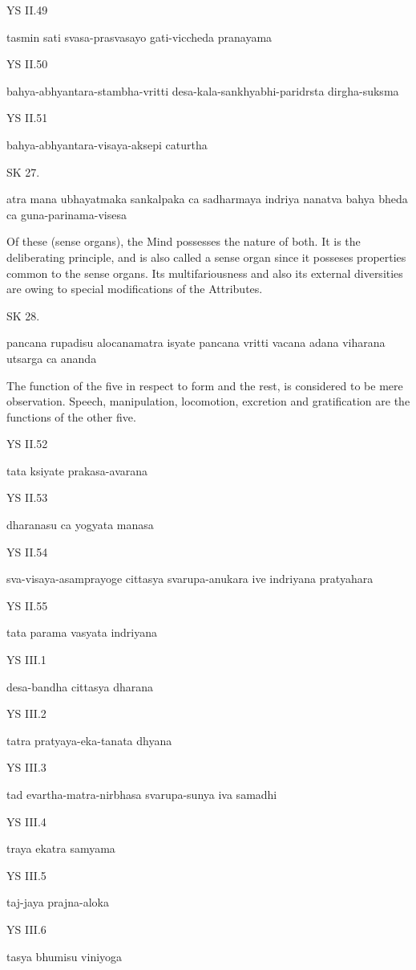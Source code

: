 YS II.49

tasmin sati svasa-prasvasayo gati-viccheda pranayama

YS II.50

bahya-abhyantara-stambha-vritti desa-kala-sankhyabhi-paridrsta dirgha-suksma

YS II.51

bahya-abhyantara-visaya-aksepi caturtha

SK 27.

atra mana ubhayatmaka sankalpaka ca sadharmaya indriya
nanatva bahya bheda ca guna-parinama-visesa

Of these (sense organs), the Mind possesses the nature of both.
It is the deliberating principle, and is also called a sense organ
since it posseses properties common to the sense organs.
Its multifariousness and also its external diversities are owing
to special modifications of the Attributes.

SK 28.

pancana rupadisu alocanamatra isyate
pancana vritti vacana adana viharana utsarga ca ananda

The function of the five in respect to form and the rest,
is considered to be mere observation.
Speech, manipulation, locomotion, excretion and gratification
are the functions of the other five.

YS II.52

tata ksiyate prakasa-avarana

YS II.53

dharanasu ca yogyata manasa

YS II.54

sva-visaya-asamprayoge cittasya svarupa-anukara ive indriyana pratyahara

YS II.55

tata parama vasyata indriyana

YS III.1

desa-bandha cittasya dharana

YS III.2

tatra pratyaya-eka-tanata dhyana

YS III.3

tad evartha-matra-nirbhasa svarupa-sunya iva samadhi

YS III.4

traya ekatra samyama

YS III.5

taj-jaya prajna-aloka

YS III.6

tasya bhumisu viniyoga

